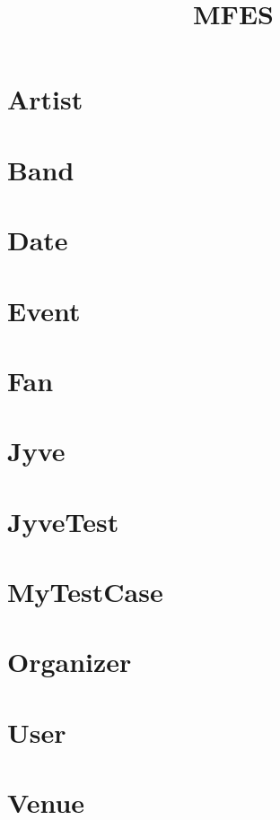 \documentclass{article}
\begin{document}
\title{MFES}
\author{}
\maketitle
\tableofcontents

\section{Artist}

\section{Band}

\section{Date}

\section{Event}

\section{Fan}

\section{Jyve}

\section{JyveTest}

\section{MyTestCase}

\section{Organizer}

\section{User}

\section{Venue}

\end{document}
